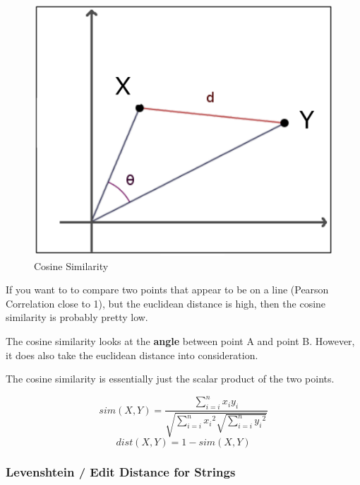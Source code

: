 \documentclass[a4paper, 11pt]{article}
\begin{document}
\begin{figure}
    \centering
    \includegraphics[keepaspectratio=true,height=14\baselineskip]{cosine_similarity.png}
    \caption{Cosine Similarity}
    \label{fig:cosine_similarity}
\end{figure}

If you want to to compare two points that appear to be on a line (Pearson Correlation close to 1), but the euclidean distance is high, then the cosine similarity is probably pretty low. 

The cosine similarity looks at the \textbf{angle} between point A and point B. However, it does also take the euclidean distance into consideration.

\vspace{10px}

The cosine similarity is essentially just the scalar product of the two points.

\vspace{10px}

\begin{equation}
	sim(X,Y) = \frac{\sum^{n}_{i=i}{x_{i} y_{i}}}{\sqrt{\sum^{n}_{i=i}{x_{i}}^2\sqrt{\sum^{n}_{i=i}{y_{i}}^2}}}
\end{equation}
\begin{equation}
	dist(X,Y) = 1 - sim(X,Y)
\end{equation}

\subsubsection{Levenshtein / Edit Distance for Strings}
\end{document}
